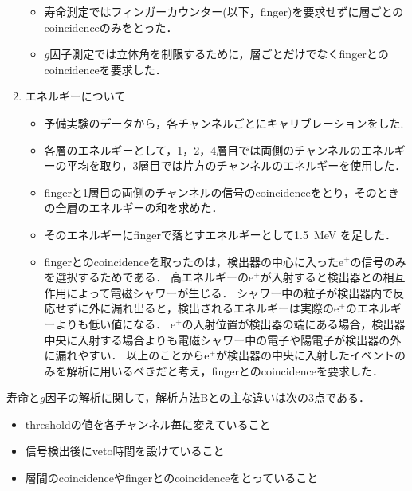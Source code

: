 \begin{enumerate}
\begin{itemize}
	  \item 寿命測定ではフィンガーカウンター(以下，finger)を要求せずに層ごとのcoincidenceのみをとった．
	  \item $g$因子測定では立体角を制限するために，層ごとだけでなくfingerとのcoincidenceを要求した．
	 \end{itemize}
   \item エネルギーについて
	 \begin{itemize}
	  \item 予備実験のデータから，各チャンネルごとにキャリブレーションをした.%
	  \item 各層のエネルギーとして，1，2，4層目では両側のチャンネルのエネルギーの平均を取り，3層目では片方のチャンネルのエネルギーを使用した．
	  \item fingerと1層目の両側のチャンネルの信号のcoincidenceをとり，そのときの全層のエネルギーの和を求めた．
	  \item そのエネルギーにfingerで落とすエネルギーとして1.5~MeV を足した．
	  \item fingerとのcoincidenceを取ったのは，検出器の中心に入ったe$^{+}$の信号のみを選択するためである．
		高エネルギーのe$^{+}$が入射すると検出器との相互作用によって電磁シャワーが生じる．
		シャワー中の粒子が検出器内で反応せずに外に漏れ出ると，検出されるエネルギーは実際のe$^{+}$のエネルギーよりも低い値になる．
		e$^{+}$の入射位置が検出器の端にある場合，検出器中央に入射する場合よりも電磁シャワー中の電子や陽電子が検出器の外に漏れやすい．
		以上のことからe$^{+}$が検出器の中央に入射したイベントのみを解析に用いるべきだと考え，fingerとのcoincidenceを要求した．
	 \end{itemize}
  \end{enumerate}

  寿命と$g$因子の解析に関して，解析方法Bとの主な違いは次の3点である．
  \begin{itemize}
   \item thresholdの値を各チャンネル毎に変えていること
   \item 信号検出後にveto時間を設けていること
   \item 層間のcoincidenceやfingerとのcoincidenceをとっていること
  \end{itemize}
  
